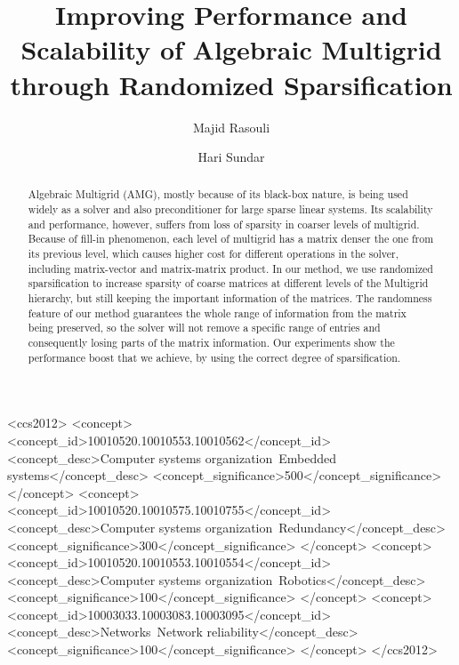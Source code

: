 \documentclass[sigconf]{acmart}
\begin{document}
\title{Improving Performance and Scalability of Algebraic Multigrid through Randomized Sparsification}

\author{Majid Rasouli}

\author{Hari Sundar}




\begin{abstract}
Algebraic Multigrid (AMG), mostly because of its black-box nature, is being used widely as a solver and also preconditioner for large sparse linear systems.
Its scalability and performance, however, suffers from loss of sparsity in coarser levels of multigrid. Because of fill-in phenomenon, each level of multigrid has a matrix denser the one from its previous level, which causes higher cost for different operations in the solver, including matrix-vector and matrix-matrix product.
In our method, we use randomized sparsification to increase sparsity of coarse
matrices at different levels of the Multigrid hierarchy, but still keeping the important information of the matrices. The randomness feature of our method guarantees the whole range of information from the matrix being preserved, so the solver will not remove a specific range of entries and consequently losing parts of the matrix information.
Our experiments show the performance boost that we achieve, by using the correct degree of sparsification.
\end{abstract}

%
%
\iffalse
\begin{CCSXML}
<ccs2012>
 <concept>
  <concept_id>10010520.10010553.10010562</concept_id>
  <concept_desc>Computer systems organization~Embedded systems</concept_desc>
  <concept_significance>500</concept_significance>
 </concept>
 <concept>
  <concept_id>10010520.10010575.10010755</concept_id>
  <concept_desc>Computer systems organization~Redundancy</concept_desc>
  <concept_significance>300</concept_significance>
 </concept>
 <concept>
  <concept_id>10010520.10010553.10010554</concept_id>
  <concept_desc>Computer systems organization~Robotics</concept_desc>
  <concept_significance>100</concept_significance>
 </concept>
 <concept>
  <concept_id>10003033.10003083.10003095</concept_id>
  <concept_desc>Networks~Network reliability</concept_desc>
  <concept_significance>100</concept_significance>
 </concept>
</ccs2012>
\end{CCSXML}
\end{document}
